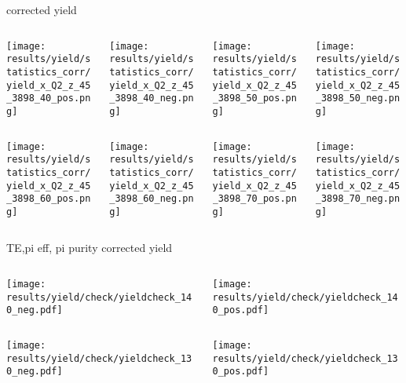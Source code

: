 \begin{frame}{corrected yield}
\begin{columns}
\begin{column}[T]{0.25\textwidth}
\texttt{[image: results/yield/statistics\_corr/yield\_x\_Q2\_z\_45\_3898\_40\_pos.png]}
\end{column}
\begin{column}[T]{0.25\textwidth}
\texttt{[image: results/yield/statistics\_corr/yield\_x\_Q2\_z\_45\_3898\_40\_neg.png]}
\end{column}
\begin{column}[T]{0.25\textwidth}
\texttt{[image: results/yield/statistics\_corr/yield\_x\_Q2\_z\_45\_3898\_50\_pos.png]}
\end{column}
\begin{column}[T]{0.25\textwidth}
\texttt{[image: results/yield/statistics\_corr/yield\_x\_Q2\_z\_45\_3898\_50\_neg.png]}
\end{column}
\end{columns}
\begin{columns}
\begin{column}[T]{0.25\textwidth}
\texttt{[image: results/yield/statistics\_corr/yield\_x\_Q2\_z\_45\_3898\_60\_pos.png]}
\end{column}
\begin{column}[T]{0.25\textwidth}
\texttt{[image: results/yield/statistics\_corr/yield\_x\_Q2\_z\_45\_3898\_60\_neg.png]}
\end{column}
\begin{column}[T]{0.25\textwidth}
\texttt{[image: results/yield/statistics\_corr/yield\_x\_Q2\_z\_45\_3898\_70\_pos.png]}
\end{column}
\begin{column}[T]{0.25\textwidth}
\texttt{[image: results/yield/statistics\_corr/yield\_x\_Q2\_z\_45\_3898\_70\_neg.png]}
\end{column}
\end{columns}
\end{frame}
\begin{frame}{TE,pi eff, pi purity corrected yield}
\begin{columns}
\begin{column}[T]{0.5\textwidth}
\texttt{[image: results/yield/check/yieldcheck\_140\_neg.pdf]}
\end{column}
\begin{column}[T]{0.5\textwidth}
\texttt{[image: results/yield/check/yieldcheck\_140\_pos.pdf]}
\end{column}
\end{columns}
\begin{columns}
\begin{column}[T]{0.5\textwidth}
\texttt{[image: results/yield/check/yieldcheck\_130\_neg.pdf]}
\end{column}
\begin{column}[T]{0.5\textwidth}
\texttt{[image: results/yield/check/yieldcheck\_130\_pos.pdf]}
\end{column}
\end{columns}
\end{frame}
